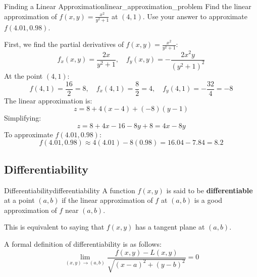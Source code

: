 \begin{problem}{Finding a Linear Approximation}{linear_approximation_problem}
Find the linear approximation of $f(x, y) = \frac{x^2}{y^2+1}$ at $(4, 1)$. 
Use your answer to approximate $f(4.01, 0.98)$.
\end{problem}

\begin{sol}
First, we find the partial derivatives of $f(x, y) = \frac{x^2}{y^2+1}$:
\[
    f_x(x, y) = \frac{2x}{y^2+1}, \quad f_y(x, y) = -\frac{2x^2y}{(y^2+1)^2}
\]
At the point $(4, 1)$:
\[
    f(4, 1) = \frac{16}{2} = 8, \quad f_x(4, 1) = \frac{8}{2} = 4, \quad f_y(4, 1) = -\frac{32}{4} = -8
\]
The linear approximation is:
\[
    z = 8 + 4(x - 4) + (-8)(y - 1)
\]
Simplifying:
\[
    z = 8 + 4x - 16 - 8y + 8 = 4x - 8y
\]
To approximate $f(4.01, 0.98)$:
\[
    f(4.01, 0.98) \approx 4(4.01) - 8(0.98) = 16.04 - 7.84 = 8.2
\]
\end{sol}

\subsection{Differentiability}

\begin{definition}{Differentiability}{differentiability}
A function $f(x, y)$ is said to be \textbf{differentiable} at a point $(a, b)$ if the linear approximation of $f$ at $(a, b)$ is a good approximation of $f$ near $(a, b)$.

This is equivalent to saying that $f(x, y)$ has a tangent plane at $(a, b)$.

A formal definition of differentiability is as follows:
\[
    \lim_{(x, y) \to (a, b)} \dfrac{f(x, y) - L(x, y)}{\sqrt{(x - a)^2 + (y - b)^2}} = 0
\]
\end{definition}


